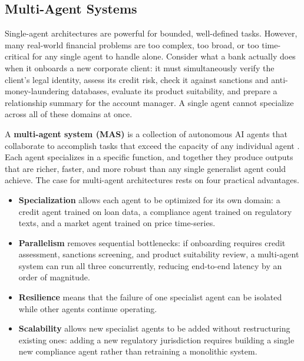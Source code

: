 \documentclass{article}
\begin{document}


\subsection{Multi-Agent Systems}
\label{sec:mas}

Single-agent architectures are powerful for bounded, well-defined tasks. However, many real-world financial problems are too complex, too broad, or too time-critical for any single agent to handle alone. Consider what a bank actually does when it onboards a new corporate client: it must simultaneously verify the client's legal identity, assess its credit risk, check it against sanctions and anti-money-laundering databases, evaluate its product suitability, and prepare a relationship summary for the account manager. A single agent cannot specialize across all of these domains at once.

A \textbf{multi-agent system (MAS)} is a collection of autonomous AI agents that collaborate to accomplish tasks that exceed the capacity of any individual agent \cite{wooldridge2009introduction}. Each agent specializes in a specific function, and together they produce outputs that are richer, faster, and more robust than any single generalist agent could achieve. The case for multi-agent architectures rests on four practical advantages. 
\begin{itemize}
    \item \textbf{Specialization} allows each agent to be optimized for its own domain: a credit agent trained on loan data, a compliance agent trained on regulatory texts, and a market agent trained on price time-series.     
    \item \textbf{Parallelism} removes sequential bottlenecks: if onboarding requires credit assessment, sanctions screening, and product suitability review, a multi-agent system can run all three concurrently, reducing end-to-end latency by an order of magnitude. 
    \item \textbf{Resilience} means that the failure of one specialist agent can be isolated while other agents continue operating. 
    \item \textbf{Scalability} allows new specialist agents to be added without restructuring existing ones: adding a new regulatory jurisdiction requires building a single new compliance agent rather than retraining a monolithic system.
\end{itemize}
\end{document}
